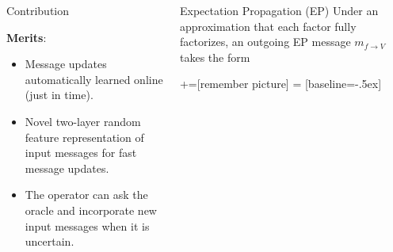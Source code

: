 \documentclass[english]{beamer}
\DeclareMathOperator*{\proj}{\text{proj}} %
\begin{document}
\begin{frame}
\begin{columns}[t]
\begin{block}{Contribution }


\vspace*{3mm}
\textbf{Merits}:
\begin{itemize}

\item  Message updates automatically learned online (just in time).

\item Novel two-layer random feature representation of input
messages for fast message updates.

\item The operator can ask the oracle and incorporate new input
messages when it is uncertain.
\end{itemize}

\end{block}


\begin{block}{Expectation Propagation (EP)}
Under an approximation that each factor fully factorizes, an outgoing EP message $m_{f\rightarrow V}$ takes the form
\vspace{15mm}
 
+=[remember picture]
 = [baseline=-.5ex]



\end{block}
\end{columns}
\end{frame}
\end{document}
